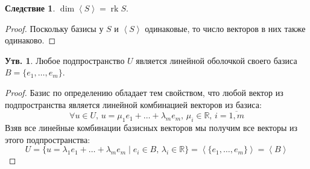 \documentclass[12pt]{article}
\newcommand{\MR}{\mathbb{R}}
\theoremstyle{definition}
\newtheorem{prop}{Утв.}
\newtheorem{corollary}{Следствие}
\DeclareMathOperator{\rk}{\text{rk}}
\newcommand{\linsp}[1]{\left\langle #1 \right\rangle }
\begin{document}
\begin{corollary}
	$\dim{\linsp{S}} = \rk{S}$.
\end{corollary}
\begin{proof}
	Поскольку базисы у $S$ и $\linsp{S}$ одинаковые, то число векторов в них также одинаково.
\end{proof}

\begin{prop}
	Любое подпространство $U$ является линейной оболочкой своего базиса $B = \{e_1, \dotsc, e_m\}$.
\end{prop}
\begin{proof}
	Базис по определению обладает тем свойством, что любой вектор из подпространства является линейной комбинацией векторов из базиса: 
	$$
		\forall u \in U, \, u =\mu_1 e_1 + \dotsc + \lambda_m e_m, \, \mu_i \in \MR, \, i = \overline{1,m}
	$$
	Взяв все линейные комбинации базисных векторов мы получим все векторы из этого подпространства:
	$$
		U = \{u = \lambda_1 e_1 + \dotsc + \lambda_m e_m \mid e_i \in B, \, \lambda_i \in \MR \} = \linsp{\{e_1 ,\dotsc, e_m\}} = \linsp{B}
	$$
\end{proof}

\newpage
\end{document}
